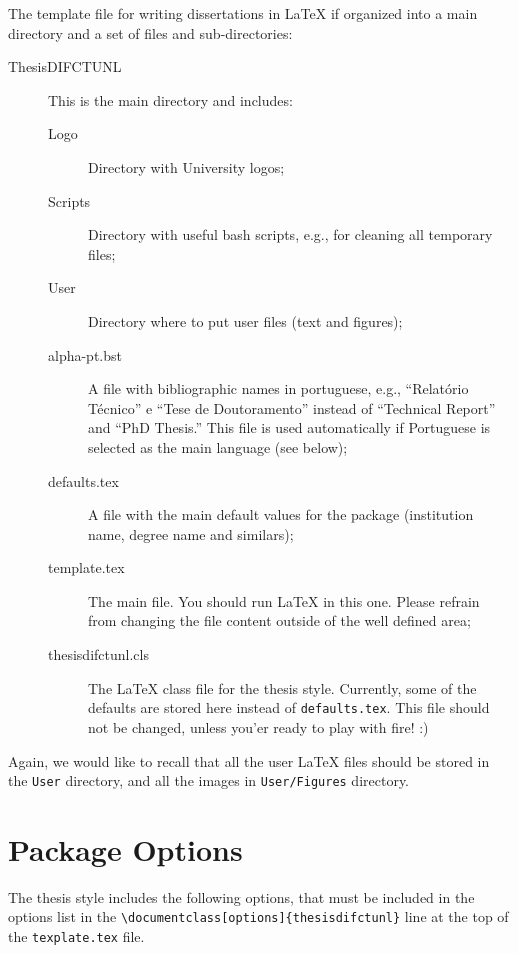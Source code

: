 The template file for writing dissertations in \LaTeX{} if organized into a main directory and a set of files and sub-directories:
\begin{description}
	\item[ThesisDIFCTUNL] This is the main directory and includes:
	\begin{description}
		\item[Logo] Directory with University logos;
		\item[Scripts] Directory with useful bash scripts, e.g., for cleaning all temporary files;
		\item[User] Directory where to put user files (text and figures);
		\item[alpha-pt.bst] A file with bibliographic names in portuguese, e.g., ``Relatório Técnico'' e ``Tese de Doutoramento'' instead of ``Technical Report'' and ``PhD Thesis.'' This file is used automatically if Portuguese is selected as the main language (see below);
		\item[defaults.tex] A file with the main default values for the package (institution name, degree name and similars);
		\item[template.tex] The main file. You should run \LaTeX{} in this one. Please refrain from changing the file content outside of the well defined area;
		\item[thesisdifctunl.cls] The \LaTeX{} class file for the thesis{} style. Currently, some of the defaults are stored here instead of \texttt{defaults.tex}. This file should not be changed, unless you'er ready to play with fire! :)
	\end{description}
\end{description}

Again, we would like to recall that all the user \LaTeX{} files should be stored in the \texttt{User} directory, and all the images in \texttt{User/Figures} directory.

\section{Package Options} %
\label{sec:package_options}

The thesis{} style includes the following options, that must be included in the options list in the \verb!\documentclass[options]{thesisdifctunl}! line at the top of the \texttt{texplate.tex} file.

